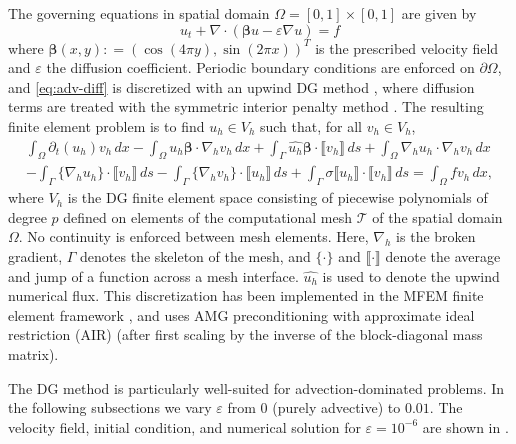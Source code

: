 \documentclass[review]{siamart}
\begin{document}
The governing equations in spatial domain $\Omega = [0,1] \times [0,1]$ are given by
\begin{equation} \label{eq:adv-diff}
	u_t + \nabla \cdot ( \bm\beta u  - \varepsilon \nabla u ) = f
\end{equation}
where $\bm\beta(x,y) : = (\cos(4\pi y), \sin(2 \pi x))^T$
is the prescribed velocity field and $\varepsilon$ the diffusion coefficient.
Periodic boundary conditions are enforced on $\partial\Omega$, and
\eqref{eq:adv-diff} is discretized with an upwind DG method \cite{Cockburn2001},
where diffusion terms are treated with the symmetric interior penalty method
\cite{Arnold1982,Arnold2002}. The resulting finite element problem is to find
$u_h \in V_h$ such that, for all $v_h \in V_h$,
\[
	\begin{multlined}
	\int_\Omega \partial_t (u_h) v_h \, dx
	- \int_\Omega u_h \bm\beta \cdot \nabla_h v_h \, dx
	+ \int_\Gamma \widehat{u_h} \bm\beta \cdot \llbracket v_h \rrbracket \, ds
	+ \int_\Omega \nabla_h u_h \cdot \nabla_h v_h \, d x \\
	- \int_\Gamma \{ \nabla_h u_h \} \cdot \llbracket v_h \rrbracket \, ds
	- \int_\Gamma \{ \nabla_h v_h \} \cdot \llbracket u_h \rrbracket \, ds
	+ \int_\Gamma \sigma \llbracket u_h \rrbracket \cdot \llbracket v_h \rrbracket \, ds
	= \int_\Omega f v_h \, dx,
	\end{multlined}
\]
where $V_h$ is the DG finite element space consisting of piecewise polynomials of degree
$p$ defined on elements of the computational mesh $\mathcal{T}$ of the spatial domain
$\Omega$. No continuity is enforced between mesh elements.
Here, $\nabla_h$ is the broken gradient, $\Gamma$ denotes the skeleton of the mesh,
and $\{ \cdot \}$ and $\llbracket \cdot \rrbracket$ denote the average and jump of a
function across a mesh interface.
$\widehat{u_h}$ is used to denote the upwind numerical flux.
This discretization has been implemented in the MFEM finite element framework
\cite{Anderson2020}, and uses AMG preconditioning with approximate ideal restriction
(AIR) \cite{Manteuffel:2019,Manteuffel:2018} (after first scaling by the inverse of the
block-diagonal mass matrix).

The DG method is particularly well-suited for advection-dominated problems.
In the following subsections we vary $\varepsilon$ from $0$ (purely advective) to $0.01$.
The velocity field, initial condition, and numerical solution for $\varepsilon = 10^{-6}$
are shown in .
\end{document}
